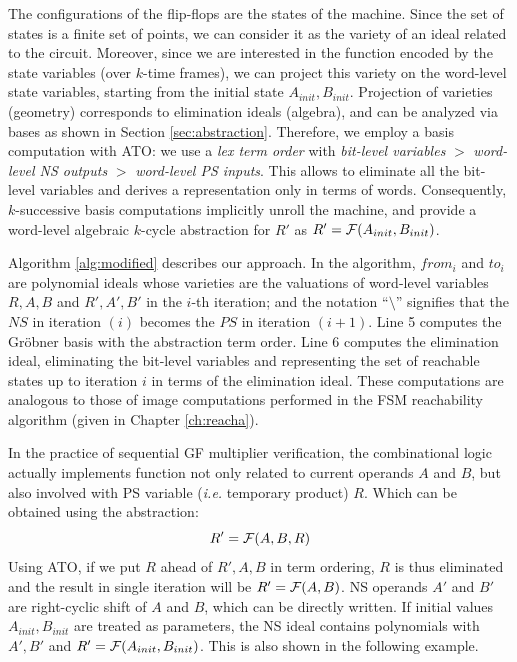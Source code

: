 The configurations of the flip-flops are the states of the
machine. Since the set of states is a finite set of points, we
can consider it as the variety of an ideal related to the circuit.
Moreover, since we are interested in
the function encoded by the state variables (over $k$-time
frames), we can project this variety on the word-level state
variables, starting from the initial state $A_{init}, B_{init}$.
Projection of varieties (geometry) corresponds to elimination ideals
(algebra), and can be analyzed via \Grobner bases as shown in Section \ref{sec:abstraction}. Therefore, we
employ a \Grobner basis computation with ATO: we use a {\it lex term
  order} with {\it bit-level variables} 
$>$ {\it word-level NS outputs} $>$ {\it word-level PS inputs}. This
allows to eliminate all the bit-level variables 
and derives a representation only in terms of words. 
Consequently, $k$-successive \Grobner basis computations implicitly
unroll the machine, and provide a word-level algebraic $k$-cycle
abstraction for $R'$ as $R' = {\mathcal{F}}(A_{init}, B_{init})$. 

Algorithm
\ref{alg:modified} describes our approach.  In the algorithm, $from_i$
and $to_i$ are polynomial ideals whose varieties are the valuations of
word-level variables $R, A, B$ and $R',A',B'$ in the $i$-th iteration;
and the notation ``$\setminus$'' signifies that the $NS$ in iteration
$(i)$ becomes the $PS$ in iteration $(i+1)$. Line 5 computes the Gr\"obner 
basis with the abstraction term order.  Line 6 computes the elimination 
ideal, eliminating the bit-level variables and representing the set of 
reachable states up to iteration $i$ in terms of the elimination ideal. 
These computations are analogous to those of image computations performed in 
the FSM reachability algorithm (given in Chapter \ref{ch:reacha}).

In the practice of sequential GF multiplier verification, the combinational 
logic actually implements function not only related to current operands $A$ and $B$,
but also involved with PS variable ({\it i.e.} temporary product) $R$. Which can be 
obtained using the abstraction:
$$R' = {\mathcal{F}}(A,B,R)$$
Using ATO, if we put $R$ ahead of $R',A,B$ in term ordering, $R$ is thus eliminated
and the result in single iteration will be $R' = {\mathcal{F}}(A,B)$. NS operands 
$A'$ and $B'$ are right-cyclic shift of $A$ and $B$, which can be directly written.
If initial values $A_{init}, B_{init}$ are treated as parameters, the NS ideal 
contains polynomials with $A', B'$ and $R' = {\mathcal{F}}(A_{init},B_{init})$. This 
is also shown in the following example.


